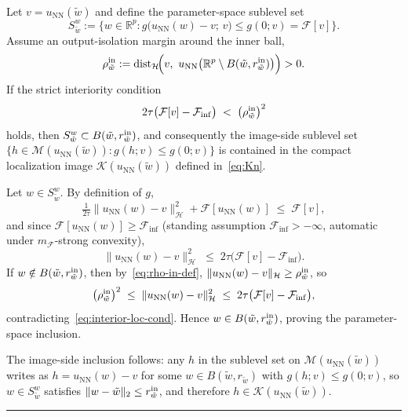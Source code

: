 \documentclass[twoside,11pt]{article}
\newcommand{\BlackBoxProof}{\rule{1.5ex}{1.5ex}}
\renewenvironment{proof}{\par\noindent{\bf Proof\ }}{\hfill\BlackBoxProof\par\medskip}
\newcommand{\R}{\mathbb{R}}
\newcommand{\NN}{\mathrm{NN}}
\newcommand{\calF}{\mathcal{F}}
\newcommand{\calH}{\mathcal{H}}
\newcommand{\calK}{\mathcal{K}}
\newcommand{\calM}{\mathcal{M}}
\newcommand{\dist}{\mathrm{dist}}
\begin{document}
\begin{lemma}\label{lem:interior-loc}
Let $v=u_\NN(\tilde w)$ and define the parameter-space sublevel set
\begin{equation}\label{eq:Snw-def}
    S^w_{\tilde w} := \Big\{w \in \R^p : g\bigl(u_\NN(w)-v;\,v\bigr) \le g(0;v) = \calF[v]\Big\}.
\end{equation}
Assume an output-isolation margin around the inner ball,
\begin{equation}\label{eq:rho-in-def}
    \rho^{\rm in}_{\tilde w} := \dist_\calH\!\Big(v,\ u_\NN\bigl(\R^p \setminus B(\tilde w, r^{\rm in}_{\tilde w})\bigr)\Big) > 0.
\end{equation}
If the strict interiority condition
\begin{equation}\label{eq:interior-loc-cond}
    2\tau\bigl(\calF[v] - \calF_{\inf}\bigr) \;<\; \bigl(\rho^{\rm in}_{\tilde w}\bigr)^2
\end{equation}
holds, then $S^w_{\tilde w} \subset B(\tilde w, r^{\rm in}_{\tilde w})$, and consequently the image-side sublevel set $\{h \in \calM(u_\NN(\tilde w)) : g(h;v) \le g(0;v)\}$ is contained in the compact localization image $\calK(u_\NN(\tilde w))$ defined in~\eqref{eq:Kn}.
\end{lemma}

\begin{proof}
Let $w \in S^w_{\tilde w}$. By definition of $g$,
\[
    \tfrac{1}{2\tau}\|u_\NN(w) - v\|^2_\calH + \calF[u_\NN(w)] \;\le\; \calF[v],
\]
and since $\calF[u_\NN(w)] \ge \calF_{\inf}$ (standing assumption $\calF_{\inf} > -\infty$, automatic under $m_\calF$-strong convexity),
\begin{equation}\label{eq:energy-bound-on-Sw}
    \|u_\NN(w) - v\|^2_\calH \;\le\; 2\tau\bigl(\calF[v] - \calF_{\inf}\bigr).
\end{equation}
If $w \notin B(\tilde w, r^{\rm in}_{\tilde w})$, then by~\eqref{eq:rho-in-def}, $\|u_\NN(w) - v\|_\calH \ge \rho^{\rm in}_{\tilde w}$, so
\[
    \bigl(\rho^{\rm in}_{\tilde w}\bigr)^2 \;\le\; \|u_\NN(w) - v\|^2_\calH \;\le\; 2\tau\bigl(\calF[v] - \calF_{\inf}\bigr),
\]
contradicting~\eqref{eq:interior-loc-cond}. Hence $w \in B(\tilde w, r^{\rm in}_{\tilde w})$, proving the parameter-space inclusion.

The image-side inclusion follows: any $h$ in the sublevel set on $\calM(u_\NN(\tilde w))$ writes as $h = u_\NN(w) - v$ for some $w \in B(\tilde w, r_{\tilde w})$ with $g(h;v) \le g(0;v)$, so $w \in S^w_{\tilde w}$ satisfies $\|w-\tilde w\|_2 \le r^{\rm in}_{\tilde w}$, and therefore $h \in \calK(u_\NN(\tilde w))$.
\end{proof}
\end{document}
